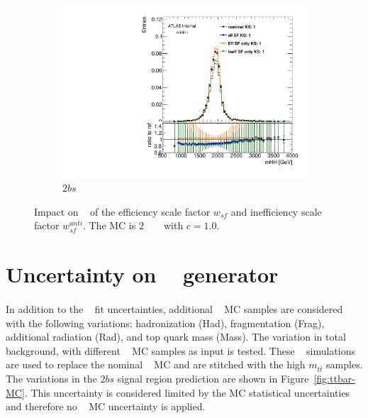 \begin{figure}[htb!]
    \\
    \begin{subfigure}[b]{0.45\textwidth}
        \includegraphics[width=\textwidth,angle=-90]{figures/boosted/AppendixbSF/directcompare_mHH_l_bSF_2000_FT_EFF_Eigen_B_0__1down_TwoTag_split_.pdf}
        \caption{$2bs$}
        \label{fig:signal_bsyst_reduction-2b}
    \end{subfigure}
  \caption{Impact on \mtwoJ~ of the efficiency scale factor $w_{sf}$ and inefficiency scale factor $w_{sf}^{anti}$. The MC is $2$ \TeV~ \Grav~ with $c=1.0$.}
  \label{fig:signal_bsyst_reduction}
\end{figure}

\section{Uncertainty on \ttbar~ generator}
\label{sec:ttbar-mc-unc}

\paragraph{}
In addition to the \ttbar~ fit uncertainties, additional \ttbar~ MC samples are considered with the following variations: hadronization (Had), fragmentation (Frag), additional radiation (Rad), and top quark mass (Mass).
The variation in total background, with different \ttbar~ MC samples as input is tested.
These \ttbar~ simulations are used to replace the nominal \ttbar~ MC and are stitched with the high $m_{t\bar{t}}$ samples. 
The variations in the $2bs$ signal region prediction are shown in Figure~\ref{fig:ttbar-MC}. 
This uncertainty is considered limited by the MC statistical uncertainties and therefore no \ttbar~ MC uncertainty is applied.


